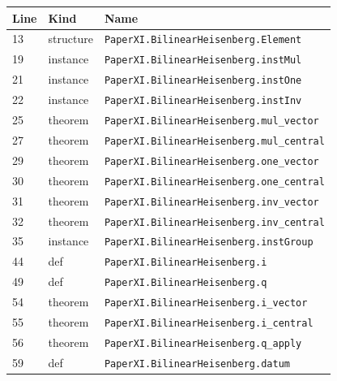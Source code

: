 \documentclass[10pt,oneside]{book}
\begin{document}
\begin{longtable}{@{}p{}p{}p{}@{}}\toprule Line&Kind&Name\\\midrule\endhead

13&structure&\nolinkurl{PaperXI.BilinearHeisenberg.Element}\\

19&instance&\nolinkurl{PaperXI.BilinearHeisenberg.instMul}\\

21&instance&\nolinkurl{PaperXI.BilinearHeisenberg.instOne}\\

22&instance&\nolinkurl{PaperXI.BilinearHeisenberg.instInv}\\

25&theorem&\nolinkurl{PaperXI.BilinearHeisenberg.mul_vector}\\

27&theorem&\nolinkurl{PaperXI.BilinearHeisenberg.mul_central}\\

29&theorem&\nolinkurl{PaperXI.BilinearHeisenberg.one_vector}\\

30&theorem&\nolinkurl{PaperXI.BilinearHeisenberg.one_central}\\

31&theorem&\nolinkurl{PaperXI.BilinearHeisenberg.inv_vector}\\

32&theorem&\nolinkurl{PaperXI.BilinearHeisenberg.inv_central}\\

35&instance&\nolinkurl{PaperXI.BilinearHeisenberg.instGroup}\\

44&def&\nolinkurl{PaperXI.BilinearHeisenberg.i}\\

49&def&\nolinkurl{PaperXI.BilinearHeisenberg.q}\\

54&theorem&\nolinkurl{PaperXI.BilinearHeisenberg.i_vector}\\

55&theorem&\nolinkurl{PaperXI.BilinearHeisenberg.i_central}\\

56&theorem&\nolinkurl{PaperXI.BilinearHeisenberg.q_apply}\\

59&def&\nolinkurl{PaperXI.BilinearHeisenberg.datum}\\


\end{longtable}
\end{document}
